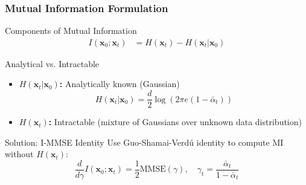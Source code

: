 \documentclass[aspectratio=169]{beamer}
\begin{document}
\begin{frame}
\frametitle{Mutual Information Formulation}
\begin{block}{Components of Mutual Information}
\begin{align}
I(\mathbf{x}_0; \mathbf{x}_t) &= H(\mathbf{x}_t) - H(\mathbf{x}_t|\mathbf{x}_0)
\end{align}
\end{block}

\begin{block}{Analytical vs. Intractable}
\begin{itemize}
\item \textbf{$H(\mathbf{x}_t|\mathbf{x}_0)$:} Analytically known (Gaussian)
\begin{equation}
H(\mathbf{x}_t|\mathbf{x}_0) = \frac{d}{2}\log(2\pi e (1-\bar{\alpha}_t))
\end{equation}

\item \textbf{$H(\mathbf{x}_t)$:} Intractable (mixture of Gaussians over unknown data distribution)
\end{itemize}
\end{block}

\begin{alertblock}{Solution: I-MMSE Identity}
Use Guo-Shamai-Verd\'u identity to compute MI without $H(\mathbf{x}_t)$:
\begin{equation}
\frac{d}{d\gamma} I(\mathbf{x}_0;\mathbf{x}_t) = \frac{1}{2}\text{MMSE}(\gamma), \quad \gamma_t = \frac{\bar{\alpha}_t}{1-\bar{\alpha}_t}
\end{equation}
\end{alertblock}
\end{frame}
\end{document}
